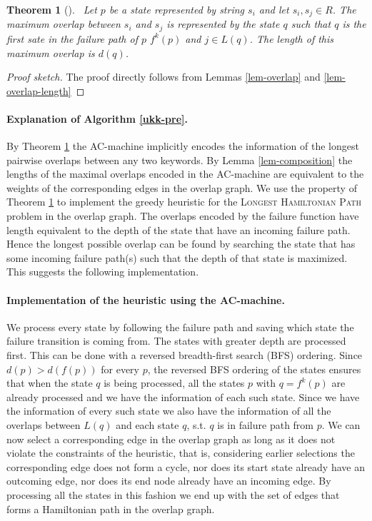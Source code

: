 \documentclass[english,twoside,censored,csm,algorithms-track-2020]{HYthesisML}
\theoremstyle{plain}
\newtheorem{theorem}{Theorem}[chapter]
\theoremstyle{definition}
\begin{document}
\begin{theorem}[] ~\label{thm-maximal-overlaps}
  Let $p$ be a state represented by string $s_i$ and let $s_i,s_j\in R$. The maximum overlap between
  $s_i$ and $s_j$ is represented by the state $q$ such that $q$ is the first sate in the failure
  path of $p$ $f^k(p)$ and $j\in L(q)$. The length of this maximum overlap is $d(q)$.
\end{theorem}
\begin{proof}[Proof sketch]
  The proof directly follows from Lemmas \ref{lem-overlap} and \ref{lem-overlap-length}
\end{proof}

\paragraph{Explanation of Algorithm \ref{ukk-pre}.}
By Theorem \ref{thm-maximal-overlaps} the AC-machine implicitly encodes the information of the
longest pairwise overlaps between any two keywords. By Lemma \ref{lem-composition} the lengths of the
maximal overlaps encoded in the AC-machine are equivalent to the weights of the corresponding edges
in the overlap graph. We use the property of Theorem \ref{thm-maximal-overlaps} to implement
the greedy heuristic for the \textsc{Longest Hamiltonian Path} problem in the overlap graph. The
overlaps encoded by the failure function have length equivalent to the depth of the state that
have an incoming failure path. Hence the longest possible overlap can be found by searching the state
that has some incoming failure path(s) such that the depth of that state is maximized. This suggests
the following implementation.

\paragraph{Implementation of the heuristic using the AC-machine.}
We process every state by following the failure path and saving 
which state the failure transition is coming from. 
The states with greater depth are processed first. This can be done with a reversed breadth-first
search (BFS) ordering. Since $d(p) > d(f(p))$ for every $p$, the reversed BFS ordering of the states
ensures that when the state $q$ is being processed, all the states $p$ with $q=f^k(p)$ are already
processed and we have the information of each such state. Since we have the information of every such
state we also have the information of all the overlaps between $L(q)$ and each state $q$, s.t.
$q$ is in failure path from $p$. We can now select a corresponding edge in the overlap graph as long
as it does not violate the constraints of the heuristic, that is, considering earlier selections
the corresponding edge does not form a cycle, nor does its start state already have an outcoming
edge, nor does its end node already have an incoming edge. By processing all the states in this
fashion we end up with the set of edges that forms a Hamiltonian path in the
overlap graph. 
\end{document}
